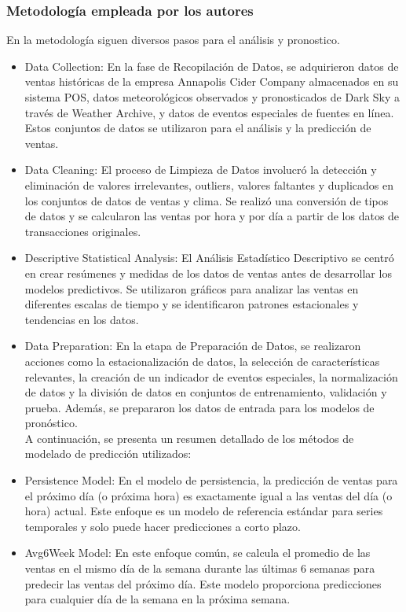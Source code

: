 \subsubsection{Metodología empleada por los autores}
En la metodología siguen diversos pasos para el análisis y pronostico.
\begin{itemize}
	\item Data Collection: En la fase de Recopilación de Datos, se adquirieron datos de ventas históricas de la empresa Annapolis Cider Company almacenados en su sistema POS, datos meteorológicos observados y pronosticados de Dark Sky a través de Weather Archive, y datos de eventos especiales de fuentes en línea. Estos conjuntos de datos se utilizaron para el análisis y la predicción de ventas.
	\item Data Cleaning: El proceso de Limpieza de Datos involucró la detección y eliminación de valores irrelevantes, outliers, valores faltantes y duplicados en los conjuntos de datos de ventas y clima. Se realizó una conversión de tipos de datos y se calcularon las ventas por hora y por día a partir de los datos de transacciones originales.
	\item Descriptive Statistical Analysis: El Análisis Estadístico Descriptivo se centró en crear resúmenes y medidas de los datos de ventas antes de desarrollar los modelos predictivos. Se utilizaron gráficos para analizar las ventas en diferentes escalas de tiempo y se identificaron patrones estacionales y tendencias en los datos.
	\item Data Preparation: En la etapa de Preparación de Datos, se realizaron acciones como la estacionalización de datos, la selección de características relevantes, la creación de un indicador de eventos especiales, la normalización de datos y la división de datos en conjuntos de entrenamiento, validación y prueba. Además, se prepararon los datos de entrada para los modelos de pronóstico.\\
	
	A continuación, se presenta un resumen detallado de los métodos de modelado de predicción utilizados:
	
	\item Persistence Model:
	En el modelo de persistencia, la predicción de ventas para el próximo día (o próxima hora) es exactamente igual a las ventas del día (o hora) actual. Este enfoque es un modelo de referencia estándar para series temporales y solo puede hacer predicciones a corto plazo.
	\item Avg6Week Model:
	En este enfoque común, se calcula el promedio de las ventas en el mismo día de la semana durante las últimas 6 semanas para predecir las ventas del próximo día. Este modelo proporciona predicciones para cualquier día de la semana en la próxima semana.
	

\end{itemize}
